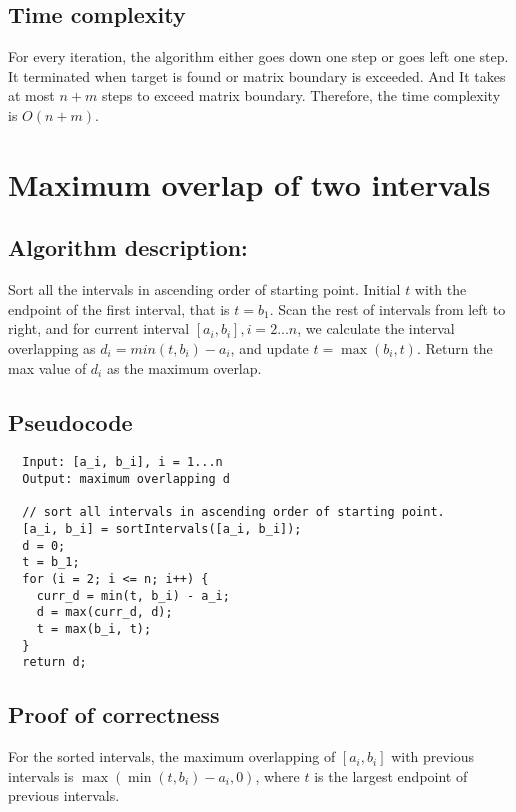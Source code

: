 \documentclass[paper=a4, fontsize=11pt]{scrartcl} %
\numberwithin{equation}{section} %
\numberwithin{figure}{section} %
\numberwithin{table}{section} %
\newcounter{claimcounter}
\numberwithin{claimcounter}{section}
\newenvironment{claim}{\stepcounter{claimcounter}{\textbf{Claim \theclaimcounter:}}}{}
\begin{document}
\subsection*{Time complexity}
For every iteration, the algorithm either goes down one step or goes left 
one step. It terminated when target is found or matrix boundary is
exceeded. And It takes at most $n+m$ steps to exceed matrix boundary. 
Therefore, the time complexity is $O(n+m)$. 



\section{Maximum overlap of two intervals}
\subsection*{Algorithm description:}
Sort all the intervals in ascending order of starting point. Initial $t$ with
the endpoint of the first interval, that is $t = b_1$. Scan the rest of intervals from left to
right, and for current interval $[a_i, b_i], i = 2...n$, we calculate the interval overlapping
as $d_i = min(t,b_i) - a_i$, and update $t = \max(b_i, t)$. Return the max value of
$d_i$ as the maximum overlap. 

\subsection*{Pseudocode}
\begin{verbatim}
  Input: [a_i, b_i], i = 1...n
  Output: maximum overlapping d

  // sort all intervals in ascending order of starting point.
  [a_i, b_i] = sortIntervals([a_i, b_i]);
  d = 0;
  t = b_1;
  for (i = 2; i <= n; i++) {
    curr_d = min(t, b_i) - a_i;
    d = max(curr_d, d);
    t = max(b_i, t);
  }
  return d;
\end{verbatim}

\subsection*{Proof of correctness}
\begin{claim}
  For the sorted intervals, the maximum overlapping of $[a_i, b_i]$ with
  previous intervals is $\max(\min(t, b_i) - a_i, 0)$, where $t$ is the largest
  endpoint of previous intervals.
\end{claim}
\end{document}
